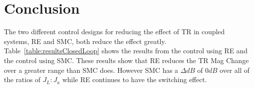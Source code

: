  \section{Conclusion}
The two different control designs for reducing the effect of TR in coupled systems, RE and SMC, both
reduce the effect greatly. Table~\ref{table:resultsClosedLoop} shows the results from the control using RE 
and the control using SMC. These results show that RE reduces the TR Mag Change over a
greater range than SMC does. However SMC has a $\Delta dB$ of $0dB$ over all of the ratios of $J_L:J_a$ while RE
continues to have the switching effect.
 
 
 